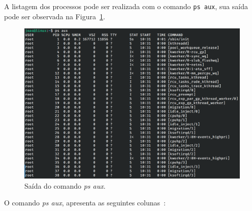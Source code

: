 \documentclass[
	12pt,				%
	oneside,   	        %
	a4paper,			%
	english,			%
	french,				%
	spanish,			%
	brazil,				%
	]{pacotes/abntex2}
\begin{document}
A listagem dos processos pode ser realizada com o comando \texttt{ps aux}, sua saída pode ser observada na Figura~\ref{fig:ps}.

\begin{figure}[H]
  \centering
  \includegraphics[scale=0.45]{figuras/ps.png}
  \caption{Saída do comando \textit{ps aux}.}
  \label{fig:ps}
\end{figure}

O comando \textit{ps aux}, apresenta as seguintes colunas~\cite{shotts2017}:
\end{document}
